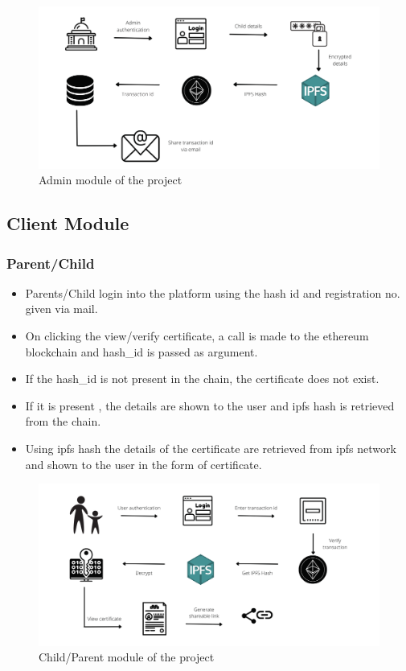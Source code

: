     \begin{figure}[H]
        \centering
        \includegraphics[width=\textwidth]{imgs/Admin_module.png}
        \caption{Admin module of the project}
        \label{fig:Admin module of the project}
        \end{figure}

\subsection{Client Module}
        \subsubsection{Parent/Child}

        \begin{itemize}
            \item Parents/Child login into the platform using the hash id and registration no. given via mail.
            \item On clicking the view/verify certificate, a call is made to the ethereum blockchain and hash\_id is passed as argument.
            \item If the hash\_id is not present in the chain, the certificate does not exist.
            \item If it is present , the details are shown to the user and ipfs hash is retrieved from the chain. 
            \item Using ipfs hash the details of the certificate are retrieved from ipfs network and shown to the user in the form of certificate.
        \end{itemize}
    
        \begin{figure}[H]
            \centering
            \includegraphics[width=\textwidth]{imgs/Child_Parent_module.png}
            \caption{Child/Parent module of the project}
            \label{fig:Child/Parent module of the project}
            \end{figure}

